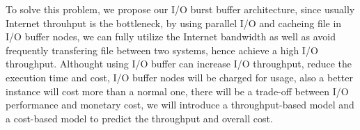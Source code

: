 To solve this problem, we propose our I/O burst buffer architecture, since usually Internet throuhput is the bottleneck, by using parallel I/O and cacheing file in I/O buffer nodes, we can fully utilize the Internet bandwidth as well as avoid frequently transfering file between two systems, hence achieve a high I/O throughput.
Althought using I/O buffer can increase I/O throughput, reduce the execution time and cost, I/O buffer nodes will be charged for usage, also a better instance will cost more than a normal one, there will be a trade-off between I/O performance and monetary cost, we will introduce a throughput-based model and a cost-based model to predict the throughput and overall cost.





